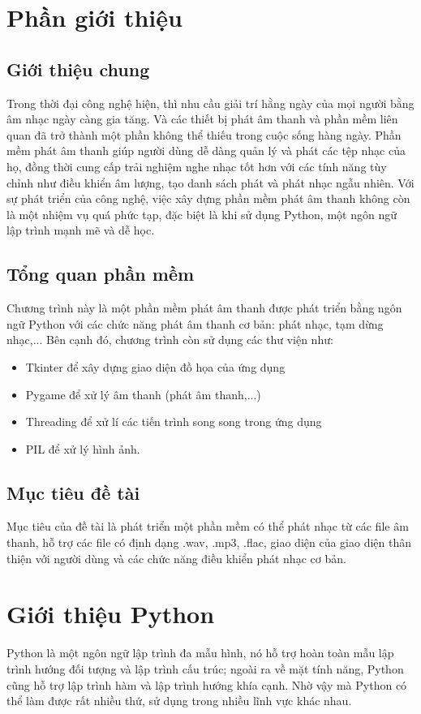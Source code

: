 \documentclass[a4paper]{article}
\begin{document}
\newpage
\tableofcontents
\newpage

\section{Phần giới thiệu}
\subsection{Giới thiệu chung}
Trong thời đại công nghệ hiện, thì nhu cầu giải trí hằng ngày của mọi người bằng âm nhạc ngày càng gia tăng. Và các thiết bị phát âm thanh và phần mềm liên quan đã trở thành một phần không thể thiếu trong cuộc sống hàng ngày. Phần mềm phát âm thanh giúp người dùng dễ dàng quản lý và phát các tệp nhạc của họ, đồng thời cung cấp trải nghiệm nghe nhạc tốt hơn với các tính năng tùy chỉnh như điều khiển âm lượng, tạo danh sách phát và phát nhạc ngẫu nhiên. Với sự phát triển của công nghệ, việc xây dựng phần mềm phát âm thanh không còn là một nhiệm vụ quá phức tạp, đặc biệt là khi sử dụng Python, một ngôn ngữ lập trình mạnh mẽ và dễ học.

\subsection{Tổng quan phần mềm}
Chương trình này là một phần mềm phát âm thanh được phát triển bằng ngôn ngữ Python với các chức năng phát âm thanh cơ bản: phát nhạc, tạm dừng nhạc,... Bên cạnh đó, chương trình còn sử dụng các thư viện như:
\begin{itemize}
    \item Tkinter để xây dựng giao diện đồ họa của ứng dụng
    \item Pygame để xử lý âm thanh (phát âm thanh,...)
    \item Threading để xử lí các tiến trình song song trong ứng dụng
    \item PIL để xử lý hình ảnh.
\end{itemize}

\subsection{Mục tiêu đề tài}
Mục tiêu của đề tài là phát triển một phần mềm có thể phát nhạc từ các file âm thanh, hỗ trợ các file có định dạng .wav, .mp3, .flac, giao diện của giao diện thân thiện với người dùng và các chức năng điều khiển phát nhạc cơ bản.

\section{Giới thiệu Python}
Python là một ngôn ngữ lập trình đa mẫu hình, nó hỗ trợ hoàn toàn mẫu lập trình hướng đối tượng và lập trình cấu trúc; ngoài ra về mặt tính năng, Python cũng hỗ trợ lập trình hàm và lập trình hướng khía cạnh. Nhờ vậy mà Python có thể làm được rất nhiều thứ, sử dụng trong nhiều lĩnh vực khác nhau.
\end{document}
